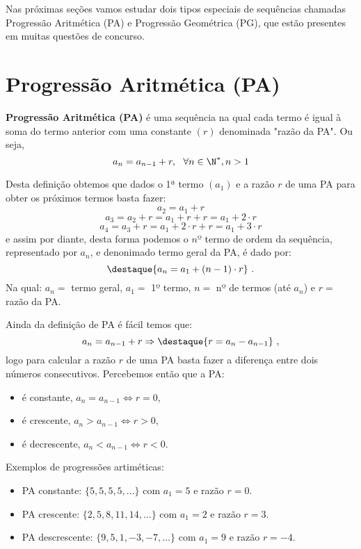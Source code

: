  Nas próximas seções vamos estudar dois tipos especiais de sequências chamadas Progressão Aritmética (PA) e Progressão Geométrica (PG), que estão presentes em muitas questões de concurso.

\section{Progressão Aritmética (PA)}

 \colorbox{azul}{
 \begin{minipage}{0.9\linewidth}
 \begin{center}
  \textbf{Progressão Aritmética (PA)} é uma sequência na qual cada termo é igual à soma do termo anterior com uma constante $(r)$ denominada "razão da PA". Ou seja,
  \[a_{n}= a_{n-1} + r, \ \ \forall n \in \N^{\ast}, n > 1\]
 \end{center}
 \end{minipage}}
 \vskip0.3cm

 Desta definição obtemos que dados o 1ª termo $(a_1)$ e a razão $r$ de uma PA para obter os próximos termos basta fazer:
 \[a_2= a_1 + r\]
 \[a_3= a_2 + r= a_1 + r + r= a_1 + 2 \cdot r\]
 \[a_4= a_3 + r= a_1 + 2 \cdot r + r= a_1 + 3 \cdot r\]
 e assim por diante, desta forma podemos o $nº$ termo de ordem da sequência, representado por $a_n$, e denonimado termo geral da PA, é dado por:
 \[\destaque{a_n= a_1 + (n-1) \cdot r} \ .\]
 Na qual: $a_n=$ termo geral, $a_1=$ 1º termo, $n=$ nº de termos (até $a_n$) e $r=$ razão da PA.

 Ainda da definição de PA é fácil temos que:
 \[a_{n}= a_{n-1} + r \Rightarrow
 \destaque{r= a_{n} - a_{n-1}} \ ,\]
 logo para calcular a razão $r$ de uma PA basta fazer a diferença entre dois números consecutivos. Percebemos então que a PA:
 \begin{itemize}
  \item é constante, $a_n= a_{n-1} \Leftrightarrow r= 0$,
  \item é crescente, $a_n > a_{n-1} \Leftrightarrow r > 0$,
  \item é decrescente, $a_n < a_{n-1} \Leftrightarrow r < 0$.
 \end{itemize}

 \begin{exem} Exemplos de progressões artiméticas:
  \begin{itemize}
   \item PA constante: $\{5, 5, 5, 5, \ldots \}$ com $a_1= 5$ e razão $r= 0$.
   \item PA crescente: $\{2, 5, 8, 11, 14, \ldots \}$ com $a_1= 2$ e razão $r= 3$.
   \item PA descrescente: $\{9, 5, 1, -3, -7, \ldots \}$ com $a_1= 9$ e razão $r= -4$.
  \end{itemize}
 \end{exem}

